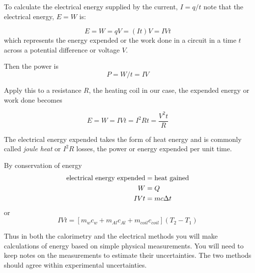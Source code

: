 \begin{multicols}{2}
To calculate the electrical energy supplied by the current, $I=q/t$ note that the electrical energy, $E = W$ is: %

\begin{equation}\label{e:iheat} E = W = qV = (It)V = IVt\end{equation}
which represents the energy expended or the work done in a circuit in a time  $t$ across a potential difference or voltage $V$.	


Then the power is 
\begin{equation}\label{e:power} P = W/t = IV \end{equation}

Apply this to a resistance $R$, the heating coil in our case, the expended energy or work done becomes

\begin{equation}\label{e:eWork} 
E = W = IVt = I^2Rt = \frac{V^2t}{R} 
\end{equation}

The electrical energy expended takes the form of heat energy and is commonly called \textsl{joule heat} or \textsl{$I^2 R$} losses, the power or energy expended per unit time.

By conservation of energy
\begin{align} 
\text{electrical energy expended} & = \text{heat gained} \notag \\
W & = Q \notag \\
IVt & = mc\Delta t \notag
\end{align}
or
\begin{equation}
IVt = [m_wc_w + m_{Al}c_{Al} + m_{coil}c_{coil}](T_2 - T_1)
\end{equation}

Thus in both the calorimetry and the electrical methods you will make calculations of energy based on simple physical measurements.  You will need to keep notes on the measurements to estimate their uncertainties.  The two methods should agree within experimental uncertainties.


\end{multicols}
